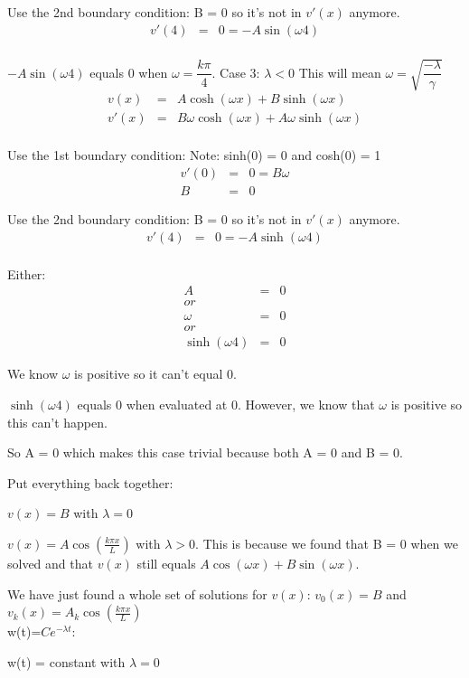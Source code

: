 \documentclass{article}
\newcommand{\bea}{\begin{eqnarray*}}
\newcommand{\eea}{\end{eqnarray*}}
\begin{document}
Use the 2nd boundary condition: B = 0 so it's not in $v'(x)$ anymore.
\bea
v'(4) &=& 0 = -A\sin(\omega 4)\\
\eea

$-A\sin(\omega 4)$ equals 0 when $\omega = \dfrac{k\pi}{4}$. \newline
Case 3: $\lambda < 0$ This will mean $\omega=\sqrt{\dfrac{-\lambda}{\gamma}}$
\bea
v(x) &=& A\cosh(\omega x)+B\sinh(\omega x) \\
v'(x) &=& B\omega \cosh(\omega x)+A\omega \sinh(\omega x)  \\
\eea

Use the 1st boundary condition: \newline
Note: sinh(0) = 0 and cosh(0) = 1
\bea
v'(0) &=& 0 = B\omega\\
B &=& 0
\eea

Use the 2nd boundary condition: B = 0 so it's not in $v'(x)$ anymore.
\bea
v'(4) &=& 0 = -A\sinh(\omega 4)\\
\eea

Either:
\bea
A &=& 0 \\
or\\
\omega &=& 0 \\
or\\
\sinh(\omega 4) &=& 0
\eea

We know $\omega$ is positive so it can't equal 0.\newline 

$\sinh(\omega 4)$ equals 0 when evaluated at 0. However, we know that $\omega$ is positive so this can't happen. \newline

So A = 0 which makes this case trivial because both A = 0 and B = 0. \newline 

Put everything back together:

$v(x) = B$ with $\lambda=0$\newline 

$v(x) = A\cos\left(\frac{k \pi x}{L}\right)$ with $\lambda > 0$.  This is because we found that B = 0 when we solved and that $v(x)$ still equals $A\cos(\omega x)+B\sin(\omega x)$.  \newline

We have just found a whole set of solutions for $v(x)$: $v_0(x) = B$ and $v_k(x) = A_k\cos\left(\frac{k\pi x}{L}\right)$\\

w(t)=$Ce^{-\lambda t}$:

w(t) = constant with  $\lambda = 0$
\end{document}
